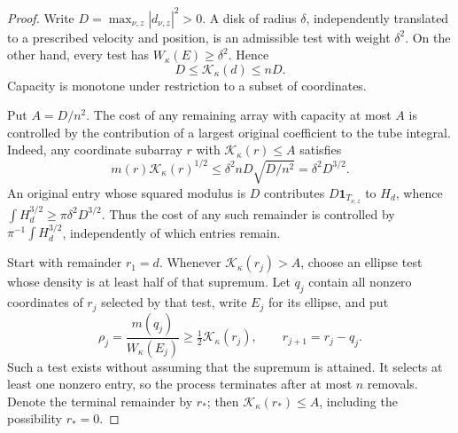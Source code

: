 \begin{proof}
Write \(D=\max_{\nu,z}|d_{\nu,z}|^2>0\). A disk of radius
\(\delta\), independently translated to a prescribed velocity and
position, is an admissible test with weight \(\delta^2\). On the
other hand, every test has \(W_\kappa(E)\ge\delta^2\). Hence
\begin{equation}\label{eq:capacity-range}
 D\le\mathcal K_\kappa(d)\le nD.
\end{equation}
Capacity is monotone under restriction to a subset of coordinates.

Put \(A=D/n^2\). The cost of any remaining array with capacity at
most \(A\) is controlled by the contribution of a largest original
coefficient to the tube integral.
Indeed, any coordinate subarray \(r\) with
\(\mathcal K_\kappa(r)\le A\) satisfies
\[
 m(r)\mathcal K_\kappa(r)^{1/2}
 \le \delta^2 nD\sqrt{D/n^2}=\delta^2D^{3/2}.
\]
An original entry whose squared modulus is \(D\) contributes
\(D\mathbf1_{T_{\nu,z}}\) to \(H_d\), whence
\(\int H_d^{3/2}\ge\pi\delta^2D^{3/2}\).
Thus the cost of any such remainder is controlled by
\(\pi^{-1}\int H_d^{3/2}\), independently of which entries remain.

Start with remainder \(r_1=d\).
Whenever \(\mathcal K_\kappa(r_j)>A\), choose an ellipse test whose
density is at least half of that supremum. Let \(q_j\) contain all
nonzero coordinates of \(r_j\) selected by that test, write
\(E_j\) for its ellipse, and put
\[
 \rho_j=\frac{m(q_j)}{W_\kappa(E_j)}
       \ge\tfrac12\mathcal K_\kappa(r_j),
 \qquad r_{j+1}=r_j-q_j.
\]
Such a test exists without assuming that the supremum is attained.
It selects at least one nonzero entry, so the process terminates after
at most \(n\) removals. Denote the terminal remainder by \(r_*\);
then \(\mathcal K_\kappa(r_*)\le A\), including the possibility
\(r_*=0\).


\end{proof}
